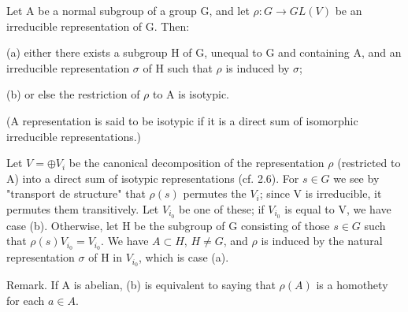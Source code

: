 Let A be a normal subgroup of a group G, and let $\rho: G \rightarrow GL(V)$ be an irreducible representation of G. Then:

(a) either there exists a subgroup H of G, unequal to G and containing A, and an irreducible representation $\sigma$ of H such that $\rho$ is induced by $\sigma$;

(b) or else the restriction of $\rho$ to A is isotypic.

(A representation is said to be isotypic if it is a direct sum of isomorphic irreducible representations.)

Let $V = \oplus V_i$ be the canonical decomposition of the representation $\rho$ (restricted to A) into a direct sum of isotypic representations (cf. 2.6). For $s \in G$ we see by "transport de structure" that $\rho(s)$ permutes the $V_i$; since V is irreducible, it permutes them transitively. Let $V_{i_0}$ be one of these; if $V_{i_0}$ is equal to V, we have case (b). Otherwise, let H be the subgroup of G consisting of those $s \in G$ such that $\rho(s)V_{i_0} = V_{i_0}$. We have $A \subset H$, $H \neq G$, and $\rho$ is induced by the natural representation $\sigma$ of H in $V_{i_0}$, which is case (a).

Remark. If A is abelian, (b) is equivalent to saying that $\rho(A)$ is a homothety for each $a \in A$.
